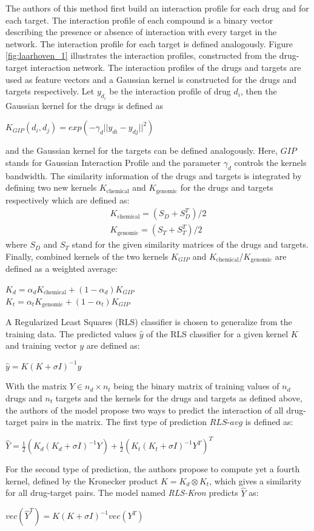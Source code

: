 The authors of this method first build an interaction profile for each drug and for each target. The interaction profile of each compound is a binary vector describing the presence or absence of interaction with every target in the network. The interaction profile for each target is defined analogously. Figure \ref{fig:laarhoven_1} illustrates the interaction profiles, constructed from the drug-target interaction network. The interaction profiles of the drugs and targets are used as feature vectors and a Gaussian kernel is constructed for the drugs and targets respectively. Let $y_{d_i}$ be the interaction profile of drug $d_i$, then the Gaussian kernel for the drugs is defined as
\begin{center}
$K_{GIP}(d_i,d_j) = exp(-\gamma_d || y_{di}-y_{dj} ||^2)$
\end{center}
and the Gaussian kernel for the targets can be defined analogously. Here, $GIP$ stands for Gaussian Interaction Profile and the parameter $\gamma_d$ controls the kernels bandwidth. The similarity information of the drugs and targets is integrated by defining two new kernels $K_{\text{chemical}}$ and $K_{\text{genomic}}$ for the drugs and targets respectively which are defined as:
\begin{equation}
\begin{split}
K_{\text{chemical}} = (S_D+S_D^T)/2 \\
K_{\text{genomic}} = (S_T+S_T^T)/2
\end{split}
\end{equation}
where $S_D$ and $S_T$ stand for the given similarity matrices of the drugs and targets. Finally, combined kernels of the two kernels $K_{GIP}$ and $K_{\text{chemical}}$/$K_{\text{genomic}}$ are defined as a weighted average:
\begin{center}
$K_d=\alpha_dK_{\text{chemical}}+(1-\alpha_d)K_{GIP}$\\
$K_t =\alpha_tK_{\text{genomic}}+(1-\alpha_t)K_{GIP}$
\end{center}
A Regularized Least Squares (RLS) classifier is chosen to generalize from the training data. The predicted values $\hat{y}$ of the RLS classifier for a given kernel $K$ and training vector $y$ are defined as:
\begin{center}
$\hat{y} = K(K+\sigma I)^{-1}y$
\end{center}
With the matrix $Y\in n_d \times n_t$ being the binary matrix of training values of $n_d$ drugs and $n_t$ targets and the kernels for the drugs and targets as defined above, the authors of the model propose two ways to predict the interaction of all drug-target pairs in the matrix. The first type of prediction $RLS$-$avg$ is defined as:
\begin{center}
$\hat{Y}=\frac{1}{2}(K_d(K_d+\sigma I)^{-1}Y)+\frac{1}{2}(K_t(K_t+\sigma I)^{-1}Y^T)^T$
\end{center}
For the second type of prediction, the authors propose to compute yet a fourth kernel, defined by the Kronecker product $K = K_d \otimes K_t$, which gives a similarity for all drug-target pairs. The model named \textit{RLS-Kron} predicts $\hat{Y}$ as:
\begin{center}
$vec(\hat{Y}^T) = K(K+\sigma I)^{-1}vec(Y^T)$
\end{center}


